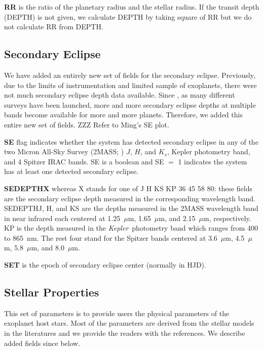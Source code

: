 \documentclass[11pt,preprint]{aastex}
\def\micron{$\mu$m}
\def\kepler{\textit{Kepler}}
\def\micron{$\mu$m}
\begin{document}
\begin{CJK*}{UTF8}{gbsn}
{\bf RR} is the ratio of the planetary radius and the stellar
radius. If the transit depth (DEPTH) is not given, we calculate DEPTH
by taking square of RR but we do not calculate RR from DEPTH.


\subsection{Secondary Eclipse}\label{sec:se}

We have added an entirely new set of fields for the secondary
eclipse. Previously, due to the limits of instrumentation and limited
sample of exoplanets, there were not much secondary eclipse depth data
available. Since \cite{Wright2011}, as many different surveys have
been launched, more and more secondary eclipse depths at multiple
bands become available for more and more planets. Therefore, we added
this entire new set of fields. ZZZ Refer to Ming's SE plot.

{\bf SE} flag indicates whether the system has detected secondary
eclipse in any of the two Micron All-Sky Survey (2MASS;
\citealt{Skrutskie2006}) $J$, $H$, and $K_s$, Kepler photometry band,
and 4 Spitzer IRAC bands. SE is a boolean and SE $=$ 1 indicates the
system has at least one detected secondary eclipse.

{\bf SEDEPTHX} whereas X stands for one of J H KS KP 36 45 58 80:
these fields are the secondary eclipse depth measured in the
corresponding wavelength band. SEDEPTHJ, H, and KS are the depths
measured in the 2MASS wavelength band in near infrared each centered
at 1.25~\micron, 1.65~\micron, and 2.15~\micron, respectively. KP is
the depth measured in the \kepler\ photometry band which ranges from
400 to 865~nm. The rest four stand for the Spitzer bands centered at
3.6~\micron, 4.5~\micron, 5.8~\micron, and 8.0~\micron.

{\bf SET} is the epoch of secondary eclipse center (normally in HJD).

\subsection{Stellar Properties}\label{sec:stellarprop}

This set of parameters is to provide users the physical parameters of
the exoplanet host stars.  Most of the parameters are derived from the
stellar models in the literatures and we provide the readers with the
references. We describe added fields since \cite{Wright2011} below.


\end{CJK*}
\end{document}
